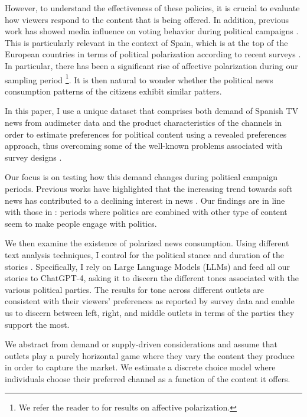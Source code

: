 \documentclass[12pt]{article}
\begin{document}
	However, to understand the effectiveness of these policies, it is crucial to evaluate how viewers respond to the content that is being offered. In addition, previous work has showed media influence on voting behavior during political campaigns \citep{enikolopov}. This is particularly relevant in the context of Spain, which is at the top of the European countries in terms of political polarization according to recent surveys \citep{edelman_trust_2023}. In particular, there has been a significant  rise of affective polarization during our sampling period \footnote{  We refer the reader to  \cite {cemop_polarization_2024} for results on affective polarization.}. It is then natural to wonder whether the political news consumption patterns of the citizens exhibit similar patters. 
	
	
	In this paper, I use a unique dataset that comprises both  demand of Spanish TV news  from audimeter data and the product characteristics of the channels in order to estimate preferences for political content using a revealed preferences approach, thus overcoming some of the well-known problems associated with survey designs \citep{prior}.
	
	
	Our focus is on testing how this demand changes during political campaign periods.  Previous works have highlighted that the increasing trend towards soft news has contributed to a declining interest in news   \citep{patterson2000doing} . Our findings are in line with those in \cite{gambaro2021revealed}: periods where politics are combined with other type of content seem to make people engage with politics.
	
	We then examine the existence of polarized news consumption.  Using different text analysis techniques,  I control for the political stance and duration of the stories \citep{puglisi_review}. Specifically, I rely on Large Language Models (LLMs) and feed all our stories to ChatGPT-4, asking it to discern the different tones associated with the various political parties. The results for tone across different outlets are consistent with their viewers' preferences as reported by survey data and enable us to discern between left, right, and middle outlets in terms of the parties they support the most.
	
	We abstract from demand or supply-driven considerations \citep{gentzkow2011competition} and assume that outlets play a purely horizontal game where they vary the content they produce in order to capture the market. We estimate a discrete choice model \citep{berry1994estimating} where individuals choose their preferred channel as a function of the content it offers.  
	
\end{document}
